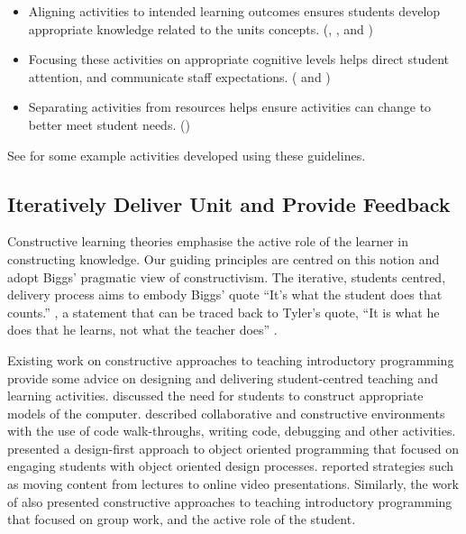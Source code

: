\begin{itemize}[noitemsep,nolistsep]
	\item Aligning activities to intended learning outcomes ensures students develop appropriate knowledge related to the units concepts. (, , and )
	\item Focusing these activities on appropriate cognitive levels helps direct student attention, and communicate staff expectations. ( and )
	\item Separating activities from resources helps ensure activities can change to better meet student needs. ()
\end{itemize}

See  for some example activities developed using these guidelines.



\subsection{Iteratively Deliver Unit and Provide Feedback} %
\label{ssub:deliver_unit}

Constructive learning theories emphasise the active role of the learner in constructing knowledge. Our guiding principles are centred on this notion and adopt Biggs' pragmatic view of constructivism. The iterative, students centred, delivery process aims to embody Biggs' quote ``It's what the student does that counts.'' \cite{Biggs:1996c}, a statement that can be traced back to Tyler's quote, ``It is what he does that he learns, not what the teacher does'' \cite{Tyler:1969}.

Existing work on constructive approaches to teaching introductory programming provide some advice on designing and delivering student-centred teaching and learning activities. \citet{BenAri:1998,BenAri:2001} discussed the need for students to construct appropriate models of the computer. \citet{VanGorp:2001} described collaborative and constructive environments with the use of code walk-throughs, writing code, debugging and other activities. \citet{Thramboulidis:2003} presented a design-first approach to object oriented programming that focused on engaging students with object oriented design processes. \citet{Wulf:2005} reported strategies such as moving content from lectures to online video presentations. Similarly, the work of \citet{Thota:2010} also presented constructive approaches to teaching introductory programming that focused on group work, and the active role of the student.

